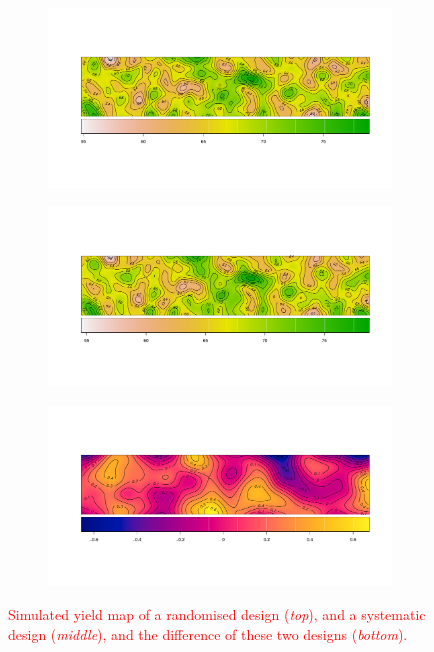 \documentclass[a4paper]{article} 	%
\newcommand{\zc}[1]{\textcolor{red}{#1}}
\begin{document}
\begin{figure}[!htp]
\centering
    \begin{subfigure}[t]{0.9\textwidth}
		\centering
		\includegraphics[width=\linewidth]{quad_random_yield_mat.pdf}
    \end{subfigure}
    \begin{subfigure}[t]{0.9\textwidth}
		\centering
		\includegraphics[width=\linewidth]{quad_syst_yield_mat.pdf}
    \end{subfigure}
    \begin{subfigure}[t]{0.9\textwidth}
		\centering
		\includegraphics[width=\linewidth]{quad_diff_yield_mat.pdf}
    \end{subfigure}
	\caption{\zc{Simulated yield map of a randomised design (\textit{top}), and a systematic design (\textit{middle}), and the difference of these two designs (\textit{bottom}).}}\label{fig:yieldmap}
\end{figure}
\end{document}
